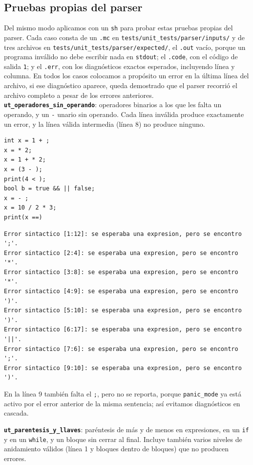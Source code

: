\documentclass[12pt,letterpaper]{article}
\begin{document}
\subsection*{Pruebas propias del parser}

Del mismo modo aplicamos con un \texttt{sh} para probar estas pruebas propias del parser.
Cada caso consta de un \texttt{.mc} en \texttt{tests/unit\_tests/parser/inputs/} y de tres archivos en
\texttt{tests/unit\_tests/parser/expected/}, el \texttt{.out} vacío, porque un programa inválido no debe
escribir nada en \texttt{stdout}; el \texttt{.code}, con el código de salida \texttt{1}; y el \texttt{.err},
con los diagnósticos exactos esperados, incluyendo línea y columna. En todos los casos colocamos a propósito
un error en la última línea del archivo, si ese diagnóstico aparece, queda demostrado que el parser recorrió
el archivo completo a pesar de los errores anteriores.\\

\textbf{\texttt{ut\_operadores\_sin\_operando}}: operadores binarios a los que les falta un operando, y un
\texttt{-} unario sin operando. Cada línea inválida produce exactamente un error, y la línea válida intermedia
(línea 8) no produce ninguno.

\begin{verbatim}
int x = 1 + ;
x = * 2;
x = 1 + * 2;
x = (3 - );
print(4 < );
bool b = true && || false;
x = - ;
x = 10 / 2 * 3;
print(x ==)
\end{verbatim}

\begin{verbatim}
Error sintactico [1:12]: se esperaba una expresion, pero se encontro ';'.
Error sintactico [2:4]: se esperaba una expresion, pero se encontro '*'.
Error sintactico [3:8]: se esperaba una expresion, pero se encontro '*'.
Error sintactico [4:9]: se esperaba una expresion, pero se encontro ')'.
Error sintactico [5:10]: se esperaba una expresion, pero se encontro ')'.
Error sintactico [6:17]: se esperaba una expresion, pero se encontro '||'.
Error sintactico [7:6]: se esperaba una expresion, pero se encontro ';'.
Error sintactico [9:10]: se esperaba una expresion, pero se encontro ')'.
\end{verbatim}

En la línea 9 también falta el \texttt{;}, pero no se reporta, porque \texttt{panic\_mode} ya está activo por
el error anterior de la misma sentencia; así evitamos diagnósticos en cascada.

\textbf{\texttt{ut\_parentesis\_y\_llaves}}: paréntesis de más y de menos en expresiones, en un
\texttt{if} y en un \texttt{while}, y un bloque sin cerrar al final. Incluye también varios niveles de
anidamiento válidos (línea 1 y bloques dentro de bloques) que no producen errores.
\end{document}
